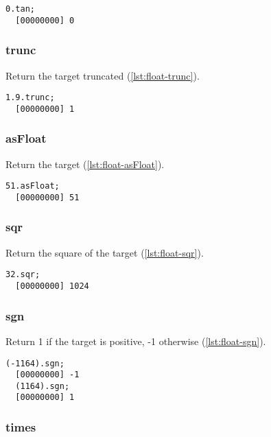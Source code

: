 \begin{lstlisting}[caption=Float.tan, label=lst:float-tan,
  float=\floatposh]
  0.tan;
  [00000000] 0
\end{lstlisting}

\subsubsection{trunc}

Return the target truncated  (\autoref{lst:float-trunc}).

\begin{lstlisting}[caption=Float.trunc, label=lst:float-trunc,
  float=\floatposh]
  1.9.trunc;
  [00000000] 1
\end{lstlisting}

\subsubsection{asFloat}

Return the target (\autoref{lst:float-asFloat}).

\begin{lstlisting}[caption=Float.asFloat, label=lst:float-asFloat,
  float=\floatposh]
  51.asFloat;
  [00000000] 51
\end{lstlisting}

\subsubsection{sqr}

Return the square of the target (\autoref{lst:float-sqr}).

\begin{lstlisting}[caption=Float.sqr, label=lst:float-sqr,
  float=\floatposh]
  32.sqr;
  [00000000] 1024
\end{lstlisting}

\subsubsection{sgn}

Return 1 if the target is positive, -1 otherwise (\autoref{lst:float-sgn}).

\begin{lstlisting}[caption=Float.sgn, label=lst:float-sgn,
  float=\floatposh]
  (-1164).sgn;
  [00000000] -1
  (1164).sgn;
  [00000000] 1
\end{lstlisting}

\subsubsection{times}

